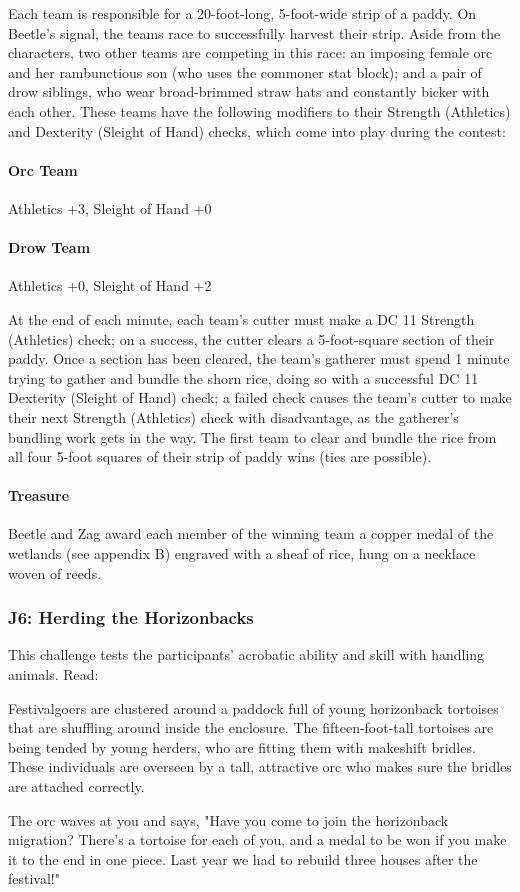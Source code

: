 \documentclass[10pt,a4paper,twoside,twocolumn,openany,nodeprecatedcode]{dndbook}
\begin{document}
Each team is responsible for a 20-foot-long, 5-foot-wide strip of a paddy. On Beetle's signal, the teams race to successfully harvest their strip. Aside from the characters, two other teams are competing in this race: an imposing female orc and her rambunctious son (who uses the commoner stat block); and a pair of drow siblings, who wear broad-brimmed straw hats and constantly bicker with each other. These teams have the following modifiers to their Strength (Athletics) and Dexterity (Sleight of Hand) checks, which come into play during the contest:

\paragraph{Orc Team}
Athletics +3, Sleight of Hand +0

\paragraph{Drow Team}
Athletics +0, Sleight of Hand +2

At the end of each minute, each team's cutter must make a DC 11 Strength (Athletics) check; on a success, the cutter clears a 5-foot-square section of their paddy. Once a section has been cleared, the team's gatherer must spend 1 minute trying to gather and bundle the shorn rice, doing so with a successful DC 11 Dexterity (Sleight of Hand) check; a failed check causes the team's cutter to make their next Strength (Athletics) check with disadvantage, as the gatherer's bundling work gets in the way. The first team to clear and bundle the rice from all four 5-foot squares of their strip of paddy wins (ties are possible).

\paragraph{Treasure}
Beetle and Zag award each member of the winning team a copper medal of the wetlands (see appendix B) engraved with a sheaf of rice, hung on a necklace woven of reeds.

\subsubsection{J6: Herding the Horizonbacks}
This challenge tests the participants' acrobatic ability and skill with handling animals. Read:

\begin{DndReadAloud}{}
Festivalgoers are clustered around a paddock full of young horizonback tortoises that are shuffling around inside the enclosure. The fifteen-foot-tall tortoises are being tended by young herders, who are fitting them with makeshift bridles. These individuals are overseen by a tall, attractive orc who makes sure the bridles are attached correctly.

The orc waves at you and says, "Have you come to join the horizonback migration? There's a tortoise for each of you, and a medal to be won if you make it to the end in one piece. Last year we had to rebuild three houses after the festival!"

\end{DndReadAloud}
\end{document}
